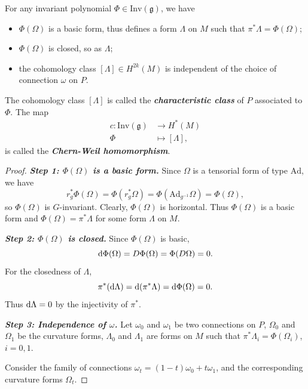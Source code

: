 \begin{theorem}
    For any invariant polynomial $\Phi\in\mathrm{Inv}(\mathfrak{g})$, we have
    \begin{itemize}[leftmargin=*]
        \item $\Phi(\Omega)$ is a basic form, thus defines a form $\Lambda$ on $M$ such that $\pi^*\Lambda = \Phi(\Omega)$; 
        \item $\Phi(\Omega)$ is closed, so as $\Lambda$; 
        \item the cohomology class $[\Lambda]\in H^{2k}(M)$ is independent of the choice of connection $\omega$ on $P$. 
    \end{itemize}
    The cohomology class $[\Lambda]$ is called the \emph{\textbf{characteristic class}} of $P$ associated to $\Phi$. The map 
    \begin{align*}
        c:\mathrm{Inv}(\mathfrak{g}) &\to H^{*}(M) \\
        \Phi &\mapsto [\Lambda],
    \end{align*}
    is called the \emph{\textbf{Chern-Weil homomorphism}}.
\end{theorem}
\begin{proof}
    \noindent\emph{\textbf{Step 1: $\Phi(\Omega)$ is a basic form.}}
    Since $\Omega$ is a tensorial form of type $\mathrm{Ad}$, we have
    \begin{equation*}
        r_g^*\Phi(\Omega) = \Phi(r_g^*\Omega) = \Phi(\mathrm{Ad}_{g^{-1}}\Omega) = \Phi(\Omega),
    \end{equation*}
    so $\Phi(\Omega)$ is $G$-invariant. Clearly, $\Phi(\Omega)$ is horizontal. 
    Thus $\Phi(\Omega)$ is a basic form and $\Phi(\Omega) = \pi^*\Lambda$ for some form $\Lambda$ on $M$.

    \noindent\emph{\textbf{Step 2: $\Phi(\Omega)$ is closed.}}
    Since $\Phi(\Omega)$ is basic, 
    \begin{equation*}
        {\rm d}\Phi(\Omega) = D\Phi(\Omega) = \Phi(D\Omega) = 0.
    \end{equation*}
    For the closedness of $\Lambda$, 
    \begin{equation*}
        \pi^*({\rm d}\Lambda) = {\rm d}(\pi^*\Lambda) = {\rm d}\Phi(\Omega) = 0.
    \end{equation*}
    Thus ${\rm d}\Lambda = 0$ by the injectivity of $\pi^*$. 

    \noindent\emph{\textbf{Step 3: Independence of $\omega$.}}
    Let $\omega_0$ and $\omega_1$ be two connections on $P$, 
    $\Omega_0$ and $\Omega_1$ be the curvature forms,
    $\Lambda_0$ and $\Lambda_1$ are forms on $M$ such that 
    $\pi^*\Lambda_i = \Phi(\Omega_i)$, $i=0,1$. 

    Consider the family of connections $\omega_t = (1-t)\omega_0 + t\omega_1$,
    and the corresponding curvature forms $\Omega_t$. 
    
\end{proof}
